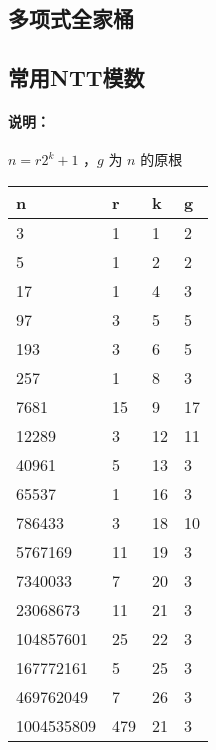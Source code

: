 	\subsection{多项式全家桶}
	
	\newpage
	\subsection{常用NTT模数}
	\paragraph{说明：} $n=r2^k+1$ ，$g$ 为 $n$ 的原根
	\begin{center}
		\renewcommand\arraystretch{1.1}
		\renewcommand\tabcolsep{30pt}
		\begin{tabular}{|l|l|l|l|}
			\hline
			 n&r&k&g\\
			 \hline
			 3                   & 1    & 1    & 2    \\
			\hline
			 5                   & 1    & 2    & 2    \\
			\hline
			 17                  & 1    & 4    & 3    \\
			\hline
			 97                  & 3    & 5    & 5    \\
			\hline
			 193                 & 3    & 6    & 5    \\
			\hline
			 257                 & 1    & 8    & 3    \\
			\hline
			 7681                & 15   & 9    & 17   \\
			\hline
			 12289               & 3    & 12   & 11   \\
			\hline
			 40961               & 5    & 13   & 3    \\
			\hline
			 65537               & 1    & 16   & 3    \\
			\hline
			 786433              & 3    & 18   & 10   \\
			\hline
			 5767169             & 11   & 19   & 3    \\
			\hline
			 7340033             & 7    & 20   & 3    \\
			\hline
			 23068673            & 11   & 21   & 3    \\
			\hline
			 104857601           & 25   & 22   & 3    \\
			\hline
			 167772161           & 5    & 25   & 3    \\
			\hline
			 469762049           & 7    & 26   & 3    \\
			\hline
			 1004535809          & 479  & 21   & 3    \\

\end{tabular}
\end{center}
